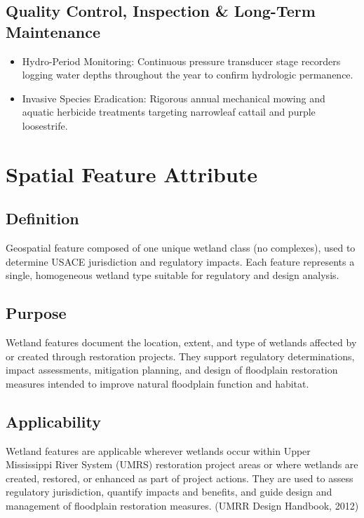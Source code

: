 \documentclass[
  letterpaper,
  DIV=11,
  numbers=noendperiod]{scrreprt}
\begin{document}
\subsection{Quality Control, Inspection \& Long-Term
Maintenance}\label{quality-control-inspection-long-term-maintenance-16}

\begin{itemize}
\item
  Hydro-Period Monitoring: Continuous pressure transducer stage
  recorders logging water depths throughout the year to confirm
  hydrologic permanence.
\item
  Invasive Species Eradication: Rigorous annual mechanical mowing and
  aquatic herbicide treatments targeting narrowleaf cattail and purple
  loosestrife.
\end{itemize}

\section{Spatial Feature Attribute}\label{spatial-feature-attribute-11}

\subsection{Definition}\label{definition-15}

Geospatial feature composed of one unique wetland class (no complexes),
used to determine USACE jurisdiction and regulatory impacts. Each
feature represents a single, homogeneous wetland type suitable for
regulatory and design analysis.

\subsection{Purpose}\label{purpose-18}

Wetland features document the location, extent, and type of wetlands
affected by or created through restoration projects. They support
regulatory determinations, impact assessments, mitigation planning, and
design of floodplain restoration measures intended to improve natural
floodplain function and habitat.

\subsection{Applicability}\label{applicability-16}

Wetland features are applicable wherever wetlands occur within Upper
Mississippi River System (UMRS) restoration project areas or where
wetlands are created, restored, or enhanced as part of project actions.
They are used to assess regulatory jurisdiction, quantify impacts and
benefits, and guide design and management of floodplain restoration
measures. (UMRR Design Handbook, 2012)
\end{document}
